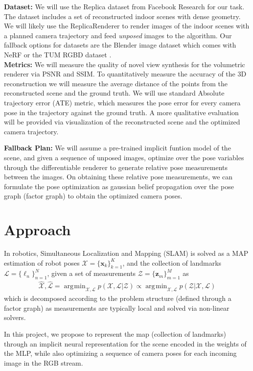 \documentclass[15pt,letterpaper]{article}
\newcommand{\Lc}{\mathcal{L}}
\newcommand{\Xc}{\mathcal{X}}
\newcommand{\Zc}{\mathcal{Z}}
\newcommand{\xv}{\mathbf{x}}
\newcommand{\zv}{\mathbf{z}}
\DeclareMathOperator*{\argmin}{arg\!\min}
\begin{document}
\textbf{Dataset:} We will use the Replica dataset \cite{replica19arxiv} from Facebook Research for our task. The dataset includes a set of reconstructed indoor scenes with dense geometry. We will likely use the ReplicaRenderer to render images of the indoor scenes with a planned camera trajectory and feed \emph{unposed} images to the algorithm. Our fallback options for datasets are the Blender image dataset which comes with NeRF \cite{nerf} or the TUM RGBD dataset \cite{sturmBenchmarkEvaluationRGBD2012}.\vspace{1.5mm}\\
{\bf Metrics:} We will measure the quality of novel view synthesis for the volumetric renderer via PSNR and SSIM. To quantitatively measure the accuracy of the 3D reconstruction we will measure the average distance of the points from the reconstructed scene and the ground truth. We will use standard Absolute trajectory error (ATE) metric, which measures the pose error for every camera pose in the trajectory against the ground truth. A more qualitative evaluation will be provided via visualization of the reconstructed scene and the optimized camera trajectory.

\textbf{Fallback Plan:} We will assume a pre-trained implicit funtion model of the scene, and given a sequence of unposed images, optimize over the pose variables through the differentiable renderer to generate relative pose measurements between the images. On obtaining these relative pose measurements, we can formulate the pose optimization as gaussian belief propagation over the pose graph (factor graph) to obtain the optimized camera poses.

\section{Approach}%
\label{sec:Approach}
In robotics, Simultaneous Localization and Mapping (SLAM) is solved as a MAP estimation of robot poses $\Xc = \{\xv_k\}_{k=1}^{K}$, and the collection of landmarks $\Lc = \{\ell_n\}_{n=1}^{N}$, given a set of measurements $\Zc = \{\zv_m\}_{m=1}^{M}$ as
\begin{align*}
\hat{\Xc}, \hat{\Lc} = \argmin_{\Xc, \Lc} p(\Xc, \Lc | \Zc) \propto \argmin_{\Xc, \Lc} p(\Zc | \Xc, \Lc)
\end{align*}
which is decomposed according to the problem structure (defined through a factor graph) as measurements are typically local and solved via non-linear solvers.

In this project, we propose to represent the map (collection of landmarks) through an implicit neural representation for the scene \cite{mildenhallNeRFRepresentingScenes2020} encoded in the weights of the MLP, while also optimizing a sequence of camera poses for each incoming image in the RGB stream.
\end{document}
